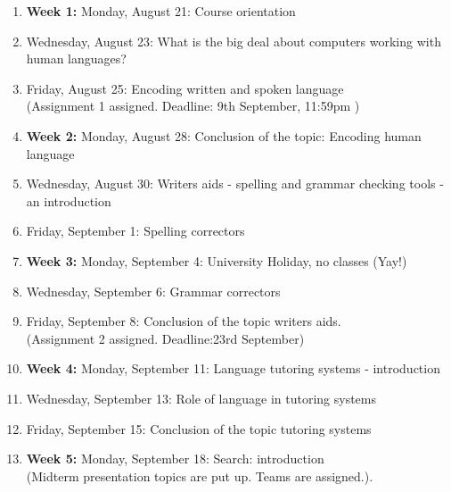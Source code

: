\documentclass[11pt,a4paper]{article}
\begin{document}
 \begin{enumerate}\itemsep0ex

\item \textbf{Week 1:} Monday, August 21: Course orientation

\item Wednesday, August 23: What is the big deal about computers working with human languages?

\item Friday, August 25:  Encoding written and spoken language 
\\ (Assignment 1 assigned. Deadline: 9th September, 11:59pm ) 
%

\item \textbf{Week 2:} Monday, August 28:  Conclusion of the topic: Encoding human language

\item Wednesday, August 30: Writers aids - spelling and grammar checking tools - an introduction

\item Friday, September 1: Spelling correctors 


\item \textbf{Week 3:} Monday, September 4: University Holiday, no classes (Yay!)

\item Wednesday, September 6:  Grammar correctors 

\item Friday, September 8: Conclusion of the topic writers aids.
\\ (Assignment 2 assigned. Deadline:23rd September) 

\item \textbf{Week 4:} Monday, September 11: Language tutoring systems - introduction

\item Wednesday, September 13: Role of language in  tutoring systems 

\item Friday, September 15: Conclusion of the topic tutoring systems

\item \textbf{Week 5:} Monday, September 18: Search: introduction
\\ (Midterm presentation topics are put up. Teams are assigned.).


\end{enumerate}
\end{document}
